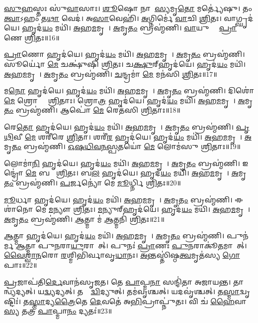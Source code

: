    \ul{𑌸𑍁}\ul{𑌹}𑌸𑍍𑌤𑌃 𑌸𑍁॑\ul{𑌵𑌾}𑌸𑌾𑌃।
   \ul{𑌶𑍂}𑌷𑍋 𑌨𑌾𑌮𑌾᳚\ul{𑌸𑍍𑌯}𑌮𑍃\ul{𑌤𑍋} 𑌮𑌰𑍍𑌤𑍍𑌯𑍇॑𑌷𑍁।
   𑌤𑌂 \ul{𑌤𑍍𑌵𑌾}𑌽𑌹𑌂 𑌤\ul{𑌥𑌾} 𑌵𑍇𑌦॑।
   𑌅\ul{𑌸𑌾}𑌵𑍇𑌹𑌿॑।
   \ul{𑌅}𑌗𑍍𑌨𑌿𑌰𑍍𑌮𑍇॑ \ul{𑌵𑌾}𑌚𑌿 \ul{𑌶𑍍𑌰𑌿}𑌤𑌃।
   𑌵𑌾𑌗𑍍𑌘𑍃𑌦॑𑌯𑍇।
   𑌹𑍃𑌦॑\ul{𑌯𑌂} 𑌮𑌯𑌿॑।
   \ul{𑌅}𑌹\ul{𑌮}𑌮𑍃𑌤𑍇᳚।
   \ul{𑌅}𑌮𑍃\ul{𑌤𑌂} 𑌬𑍍𑌰𑌹𑍍𑌮॑𑌣𑌿।
   \ul{𑌵𑌾}𑌯𑍁𑌰𑍍𑌮𑍇᳚ \ul{𑌪𑍍𑌰𑌾}𑌣𑍇 \ul{𑌶𑍍𑌰𑌿}𑌤𑌃॥16॥

   \ul{𑌪𑍍𑌰𑌾}𑌣𑍋 𑌹𑍃𑌦॑𑌯𑍇।
   𑌹𑍃𑌦॑\ul{𑌯𑌂} 𑌮𑌯𑌿॑।
   \ul{𑌅}𑌹\ul{𑌮}𑌮𑍃𑌤𑍇᳚।
   \ul{𑌅}𑌮𑍃\ul{𑌤𑌂} 𑌬𑍍𑌰𑌹𑍍𑌮॑𑌣𑌿।
   𑌸𑍂𑌰𑍍𑌯𑍋॑ \ul{𑌮𑍇} 𑌚𑌕𑍍𑌷𑍁॑𑌷𑌿 \ul{𑌶𑍍𑌰𑌿}𑌤𑌃।
   𑌚\ul{𑌕𑍍𑌷𑍁}𑌰𑍍{‌}𑌹𑍃𑌦॑𑌯𑍇।
   𑌹𑍃𑌦॑\ul{𑌯𑌂} 𑌮𑌯𑌿॑।
   \ul{𑌅}𑌹\ul{𑌮}𑌮𑍃𑌤𑍇᳚।
   \ul{𑌅}𑌮𑍃\ul{𑌤𑌂} 𑌬𑍍𑌰𑌹𑍍𑌮॑𑌣𑌿।
   \ul{𑌚}𑌨𑍍𑌦𑍍𑌰𑌮𑌾॑ \ul{𑌮𑍇} 𑌮𑌨॑𑌸𑌿 \ul{𑌶𑍍𑌰𑌿}𑌤𑌃॥17॥

   𑌮\ul{𑌨𑍋} 𑌹𑍃𑌦॑𑌯𑍇।
   𑌹𑍃𑌦॑\ul{𑌯𑌂} 𑌮𑌯𑌿॑।
   \ul{𑌅}𑌹\ul{𑌮}𑌮𑍃𑌤𑍇᳚।
   \ul{𑌅}𑌮𑍃\ul{𑌤𑌂} 𑌬𑍍𑌰𑌹𑍍𑌮॑𑌣𑌿।
   𑌦𑌿𑌶𑍋॑ \ul{𑌮𑍇} 𑌶𑍍𑌰𑍋𑌤𑍍𑌰𑍇᳚ \ul{𑌶𑍍𑌰𑌿}𑌤𑌾𑌃।
   𑌶𑍍𑌰𑍋\ul{𑌤𑍍𑌰}\ul{} 𑌹𑍃𑌦॑𑌯𑍇।
   𑌹𑍃𑌦॑\ul{𑌯𑌂} 𑌮𑌯𑌿॑।
   \ul{𑌅}𑌹\ul{𑌮}𑌮𑍃𑌤𑍇᳚।
   \ul{𑌅}𑌮𑍃\ul{𑌤𑌂} 𑌬𑍍𑌰𑌹𑍍𑌮॑𑌣𑌿।
   𑌆𑌪𑍋॑ \ul{𑌮𑍇} 𑌰𑍇𑌤॑𑌸𑌿 \ul{𑌶𑍍𑌰𑌿}𑌤𑌾𑌃॥18॥

   𑌰𑍇\ul{𑌤𑍋} 𑌹𑍃𑌦॑𑌯𑍇।
   𑌹𑍃𑌦॑\ul{𑌯𑌂} 𑌮𑌯𑌿॑।
   \ul{𑌅}𑌹\ul{𑌮}𑌮𑍃𑌤𑍇᳚।
   \ul{𑌅}𑌮𑍃\ul{𑌤𑌂} 𑌬𑍍𑌰𑌹𑍍𑌮॑𑌣𑌿।
   \ul{𑌪𑍃}\ul{𑌥𑌿}𑌵𑍀 \ul{𑌮𑍇} 𑌶𑌰𑍀॑𑌰𑍇 \ul{𑌶𑍍𑌰𑌿}𑌤𑌾।
   𑌶𑌰𑍀॑\ul{𑌰}\ul{} 𑌹𑍃𑌦॑𑌯𑍇।
   𑌹𑍃𑌦॑\ul{𑌯𑌂} 𑌮𑌯𑌿॑।
   \ul{𑌅}𑌹\ul{𑌮}𑌮𑍃𑌤𑍇᳚।
   \ul{𑌅}𑌮𑍃\ul{𑌤𑌂} 𑌬𑍍𑌰𑌹𑍍𑌮॑𑌣𑌿।
   \ul{𑌓}\ul{𑌷}\ul{𑌧𑌿}\ul{𑌵}\ul{𑌨}\ul{𑌸𑍍𑌪}𑌤𑌯𑍋॑ \ul{𑌮𑍇} 𑌲𑍋𑌮॑𑌸𑍁 \ul{𑌶𑍍𑌰𑌿}𑌤𑌾𑌃॥19॥

   𑌲𑍋𑌮𑌾॑\ul{𑌨𑌿} 𑌹𑍃𑌦॑𑌯𑍇।
   𑌹𑍃𑌦॑\ul{𑌯𑌂} 𑌮𑌯𑌿॑।
   \ul{𑌅}𑌹\ul{𑌮}𑌮𑍃𑌤𑍇᳚।
   \ul{𑌅}𑌮𑍃\ul{𑌤𑌂} 𑌬𑍍𑌰𑌹𑍍𑌮॑𑌣𑌿।
   𑌇𑌨𑍍𑌦𑍍𑌰𑍋॑ \ul{𑌮𑍇} 𑌬𑌲𑍇᳚ \ul{𑌶𑍍𑌰𑌿}𑌤𑌃।
   𑌬\ul{𑌲}\ul{} 𑌹𑍃𑌦॑𑌯𑍇।
   𑌹𑍃𑌦॑\ul{𑌯𑌂} 𑌮𑌯𑌿॑।
   \ul{𑌅}𑌹\ul{𑌮}𑌮𑍃𑌤𑍇᳚।
   \ul{𑌅}𑌮𑍃\ul{𑌤𑌂} 𑌬𑍍𑌰𑌹𑍍𑌮॑𑌣𑌿।
   \ul{𑌪}𑌰𑍍𑌜𑌨𑍍𑌯𑍋॑ 𑌮𑍇 \ul{𑌮𑍂}𑌰𑍍𑌧𑍍𑌨𑌿 \ul{𑌶𑍍𑌰𑌿}𑌤𑌃॥20॥

   \ul{𑌮𑍂}𑌰𑍍𑌧𑌾 𑌹𑍃𑌦॑𑌯𑍇।
   𑌹𑍃𑌦॑\ul{𑌯𑌂} 𑌮𑌯𑌿॑।
   \ul{𑌅}𑌹\ul{𑌮}𑌮𑍃𑌤𑍇᳚।
   \ul{𑌅}𑌮𑍃\ul{𑌤𑌂} 𑌬𑍍𑌰𑌹𑍍𑌮॑𑌣𑌿।
   𑌈𑌶𑌾॑𑌨𑍋 𑌮𑍇 \ul{𑌮}𑌨𑍍𑌯𑍗 \ul{𑌶𑍍𑌰𑌿}𑌤𑌃।
   \ul{𑌮}𑌨𑍍𑌯𑍁𑌰𑍍{‌}𑌹𑍃𑌦॑𑌯𑍇।
   𑌹𑍃𑌦॑\ul{𑌯𑌂} 𑌮𑌯𑌿॑।
   \ul{𑌅}𑌹\ul{𑌮}𑌮𑍃𑌤𑍇᳚।
   \ul{𑌅}𑌮𑍃\ul{𑌤𑌂} 𑌬𑍍𑌰𑌹𑍍𑌮॑𑌣𑌿।
   \ul{𑌆}𑌤𑍍𑌮𑌾 𑌮॑ \ul{𑌆}𑌤𑍍𑌮𑌨𑌿॑ \ul{𑌶𑍍𑌰𑌿}𑌤𑌃॥21॥
   
   \ul{𑌆}𑌤𑍍𑌮𑌾 𑌹𑍃𑌦॑𑌯𑍇।
   𑌹𑍃𑌦॑\ul{𑌯𑌂} 𑌮𑌯𑌿॑।
   \ul{𑌅}𑌹\ul{𑌮}𑌮𑍃𑌤𑍇᳚।
   \ul{𑌅}𑌮𑍃\ul{𑌤𑌂} 𑌬𑍍𑌰𑌹𑍍𑌮॑𑌣𑌿।
   𑌪𑍁𑌨॑𑌰𑍍𑌮 \ul{𑌆}𑌤𑍍𑌮𑌾 𑌪𑍁\ul{𑌨}𑌰𑌾\ul{𑌯𑍁}𑌰𑌾𑌗𑌾᳚𑌤𑍍।
   𑌪𑍁𑌨𑌃॑ \ul{𑌪𑍍𑌰𑌾}𑌣𑌃 \ul{𑌪𑍁}𑌨𑌰𑌾𑌕𑍂॑\ul{𑌤}𑌮𑌾𑌗𑌾᳚𑌤𑍍।
   \ul{𑌵𑍈}\ul{𑌶𑍍𑌵𑌾}\ul{𑌨}𑌰𑍋 \ul{𑌰}𑌶𑍍𑌮𑌿𑌭𑌿॑𑌰𑍍𑌵𑌾𑌵𑍃\ul{𑌧𑌾}𑌨𑌃।
   \ul{𑌅}𑌨𑍍𑌤𑌸𑍍𑌤𑌿॑𑌷𑍍𑌠\ul{𑌤𑍍𑌵}𑌮𑍃𑌤॑𑌸𑍍𑌯 \ul{𑌗𑍋}𑌪𑌾𑌃॥22॥
\anuvakamend

   \ul{𑌪𑍍𑌰}𑌜𑌾𑌪॑𑌤𑌿\ul{𑌰𑍍𑌦𑍇}𑌵𑌾𑌨॑𑌸𑍃𑌜𑌤।
   𑌤𑍇 \ul{𑌪𑌾}𑌪𑍍𑌮\ul{𑌨𑌾} 𑌸𑌨𑍍𑌦𑌿॑𑌤𑌾 𑌅𑌜𑌾𑌯𑌨𑍍𑌤।
   𑌤𑌾𑌨𑍍𑌵𑍍𑌯॑𑌦𑍍𑌯𑌤𑍍।
   𑌯\ul{𑌦𑍍𑌵𑍍𑌯}𑌦𑍍𑌯𑌤𑍍।
   𑌤𑌸𑍍𑌮𑌾᳚\ul{𑌦𑍍𑌵𑌿}𑌦𑍍𑌯𑍁𑌤𑍍।
   𑌤𑌮॑𑌵𑍃𑌶𑍍𑌚𑌤𑍍।
   𑌯𑌦𑌵𑍃॑𑌶𑍍𑌚𑌤𑍍।
   𑌤\ul{𑌸𑍍𑌮𑌾}𑌦𑍍𑌵𑍃𑌷𑍍𑌟𑌿𑌃॑।
   𑌤\ul{𑌸𑍍𑌮𑌾}𑌦𑍍𑌯\ul{𑌤𑍍𑌰𑍈}𑌤𑍇 \ul{𑌦𑍇}𑌵𑌤𑍇॑ 𑌅\ul{𑌭𑌿}𑌪𑍍𑌰𑌾𑌪𑍍𑌨𑍁॑𑌤𑌃।
   𑌵𑌿 𑌚॑ \ul{𑌹𑍈}𑌵𑌾\ul{𑌸𑍍𑌯} 𑌤𑌤𑍍𑌰॑ \ul{𑌪𑌾}𑌪𑍍𑌮𑌾\ul{𑌨𑌂} 𑌦𑍍𑌯𑌤𑌃॑॥23॥

